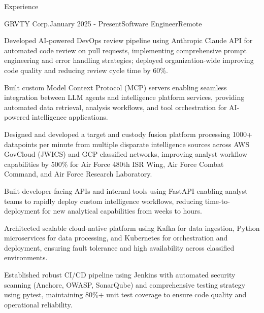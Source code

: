 \documentclass[
	11pt, %
]{resume} %
\begin{document}

\begin{rSection}{Experience}
    \begin{rSubsection}{GRVTY Corp.}{January 2025 - Present}{Software Engineer}{Remote}
        \item Developed AI-powered DevOps review pipeline using Anthropic Claude API for automated code review on pull requests, implementing comprehensive prompt engineering and error handling strategies; deployed organization-wide improving code quality and reducing review cycle time by 60\%.
        \item Built custom Model Context Protocol (MCP) servers enabling seamless integration between LLM agents and intelligence platform services, providing automated data retrieval, analysis workflows, and tool orchestration for AI-powered intelligence applications.
        \item Designed and developed a target and custody fusion platform processing 1000+ datapoints per minute from multiple disparate intelligence sources across AWS GovCloud (JWICS) and GCP classified networks, improving analyst workflow capabilities by 500\% for Air Force 480th ISR Wing, Air Force Combat Command, and Air Force Research Laboratory.
        \item Built developer-facing APIs and internal tools using FastAPI enabling analyst teams to rapidly deploy custom intelligence workflows, reducing time-to-deployment for new analytical capabilities from weeks to hours.
        \item Architected scalable cloud-native platform using Kafka for data ingestion, Python microservices for data processing, and Kubernetes for orchestration and deployment, ensuring fault tolerance and high availability across classified environments.
        \item Established robust CI/CD pipeline using Jenkins with automated security scanning (Anchore, OWASP, SonarQube) and comprehensive testing strategy using pytest, maintaining 80\%+ unit test coverage to ensure code quality and operational reliability.

    \end{rSubsection}


\end{rSection}
\end{document}
